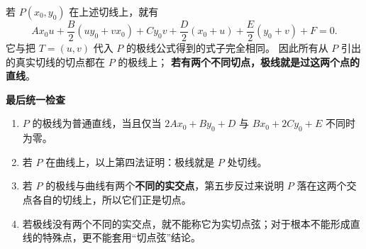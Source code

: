 \begin{proofbox}
\begin{description}[style=nextline,leftmargin=2.8em,labelsep=0.5em,itemsep=0.55em]
 \item[\textbf{步骤 5（由切线推出 $P$ 的极线）：}]
 若 $P(x_0,y_0)$ 在上述切线上，就有
 \[
 Ax_0u+\frac B2(uy_0+vx_0)+Cy_0v
 +\frac D2(x_0+u)+\frac E2(y_0+v)+F=0.
 \]
 它与把 $T=(u,v)$ 代入 $P$ 的极线公式得到的式子完全相同。
 因此所有从 $P$ 引出的真实切线的切点都在 $P$ 的极线上；
 \textbf{若有两个不同切点，极线就是过这两个点的直线}。
\end{description}

\medskip
\textbf{\textcolor{CProof}{最后统一检查}}\par\smallskip
\begin{enumerate}[leftmargin=*,itemsep=0.3em]
 \item $P$ 的极线为普通直线，当且仅当
 $2Ax_0+By_0+D$ 与 $Bx_0+2Cy_0+E$ 不同时为零。
 \item 若 $P$ 在曲线上，以上第四法证明：极线就是 $P$ 处切线。
 \item 若 $P$ 的极线与曲线有两个\textbf{不同的实交点}，第五步反过来说明 $P$ 落在这两个交点各自的切线上，所以它们正是切点。
 \item 若极线没有两个不同的实交点，就不能称它为实切点弦；对于根本不能形成直线的特殊点，更不能套用“切点弦”结论。
\end{enumerate}
\end{proofbox}
